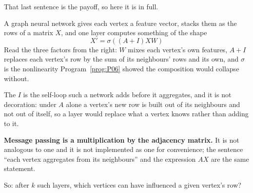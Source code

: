 \begin{fr}
That last sentence is the payoff, so here it is in full.

A graph neural network gives each vertex a feature vector, stacks them as the
rows of a matrix $X$, and one layer computes something of the shape
\[ X' = \sigma((A + I)XW) \]
Read the three factors from the right: $W$ mixes each vertex's own features,
$A + I$ replaces each vertex's row by the sum of its neighbours' rows and its
own, and $\sigma$ is the nonlinearity Program~\ref{prog:P06} showed the
composition would collapse without.

The $I$ is the self-loop such a network adds before it aggregates, and it is
not decoration: under $A$ alone a vertex's new row is built out of its
neighbours and not out of itself, so a layer would replace what a vertex knows
rather than adding to it.

\textbf{Message passing is a multiplication by the adjacency matrix.} It is
not analogous to one and it is not implemented as one for convenience; the
sentence \enquote{each vertex aggregates from its neighbours} and the
expression $AX$ are the same statement.

So: after $k$ such layers, which vertices can have influenced a given
vertex's row?
\dotline
\nextframe
\end{fr}

